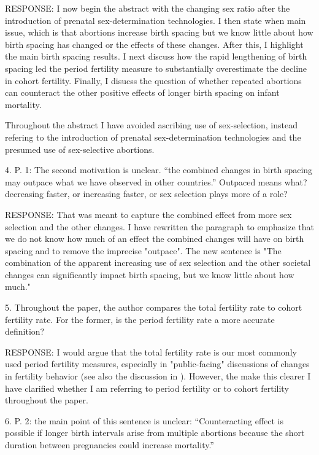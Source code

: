 \documentclass[letterpaper,12pt]{article}
\begin{document}
RESPONSE: I now begin the abstract with the changing sex ratio after the introduction 
of prenatal sex-determination technologies.
I then state when main issue, which is that abortions increase birth spacing but we
know little about how birth spacing has changed or the effects of these changes.
After this, I highlight the main birth spacing results.
I next discuss how the rapid lengthening of birth spacing led the period
fertility measure to substantially overestimate the decline in cohort fertility.
Finally, I disucss the question of whether repeated abortions can counteract the
other positive effects of longer birth spacing on infant mortality.

Throughout the abstract I have avoided ascribing use of sex-selection, instead refering to
the introduction of prenatal sex-determination technologies and the presumed use 
of sex-selective abortions.

4. P. 1: The second motivation is unclear. “the combined changes in birth spacing may
outpace what we have observed in other countries.” Outpaced means what? decreasing faster,
or increasing faster, or sex selection plays more of a role?

RESPONSE: That was meant to capture the combined effect from more sex selection and the other changes.
I have rewritten the paragraph to emphasize that we do not know how much of an effect the 
combined changes will have on birth spacing and to remove the imprecise "outpace".
The new sentence is "The combination of the apparent increasing 
use of sex selection and the other societal changes can significantly impact birth spacing, 
but we know little about how much."


5. Throughout the paper, the author compares the total fertility rate to cohort fertility
rate. For the former, is the period fertility rate a more accurate definition?

RESPONSE: I would argue that the total fertility rate is our most commonly used period
fertility measures, especially in "public-facing" discussions of changes in fertility 
behavior (see also the discussion in \citet{Hotz1997,Bongaarts1999,Ni-Bhrolchain2011}).
However, the make this clearer I have clarified whether I am referring to period fertility
or to cohort fertility throughout the paper. 


6. P. 2: the main point of this sentence is unclear: “Counteracting effect is possible if
longer birth intervals arise from multiple abortions because the short duration between
pregnancies could increase mortality.”
\end{document}
